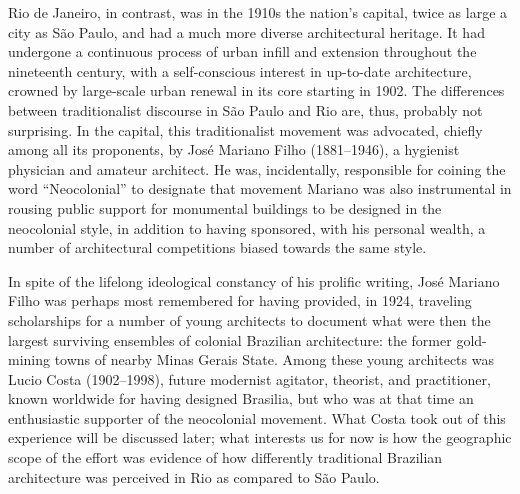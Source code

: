 Rio de Janeiro, in contrast, was in the 1910s the nation's capital,
twice as large a city as São Paulo, and had a much more diverse
architectural heritage. It had undergone a continuous process of urban
infill and extension throughout the nineteenth century, with a
self-conscious interest in up-to-date architecture, crowned by
large-scale urban renewal in its core starting in 1902. The differences
between traditionalist discourse in São Paulo and Rio are, thus,
probably not surprising. In the capital, this traditionalist movement
was advocated, chiefly among all its proponents, by José Mariano Filho
(1881--1946), a hygienist physician and amateur architect. He was,
incidentally, responsible for coining the word ``Neocolonial'' to
designate that movement \autocite[p.~132]{kessel:2008arquitetura}
Mariano was also instrumental in rousing public support for monumental
buildings to be designed in the neocolonial style, in addition to having
sponsored, with his personal wealth, a number of architectural
competitions biased towards the same style.

In spite of the lifelong ideological constancy of his prolific writing,
José Mariano Filho was perhaps most remembered for having provided, in
1924, traveling scholarships for a number of young architects to
document what were then the largest surviving ensembles of colonial
Brazilian architecture: the former gold-mining towns of nearby Minas
Gerais State. Among these young architects was Lucio Costa (1902--1998),
future modernist agitator, theorist, and practitioner, known worldwide
for having designed Brasilia, but who was at that time an enthusiastic
supporter of the neocolonial movement. What Costa took out of this
experience will be discussed later; what interests us for now is how the
geographic scope of the effort was evidence of how differently
traditional Brazilian architecture was perceived in Rio as compared to
São Paulo.

